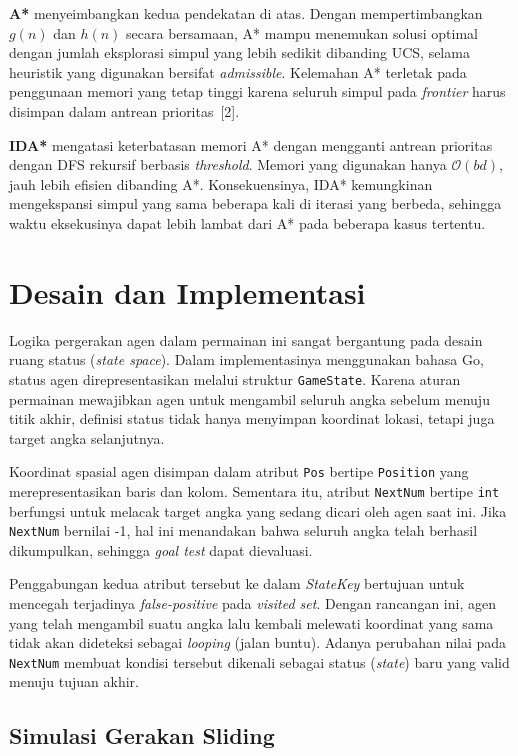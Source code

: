 \documentclass[12pt,a4paper]{article}
\begin{document}
\textbf{A*} menyeimbangkan kedua pendekatan di atas. Dengan mempertimbangkan $g(n)$
dan $h(n)$ secara bersamaan, A* mampu menemukan solusi optimal dengan jumlah
eksplorasi simpul yang lebih sedikit dibanding UCS, selama heuristik yang digunakan
bersifat \textit{admissible}. Kelemahan A* terletak pada penggunaan memori yang
tetap tinggi karena seluruh simpul pada \textit{frontier} harus disimpan dalam
antrean prioritas~[2].

\textbf{IDA*} mengatasi keterbatasan memori A* dengan mengganti antrean prioritas
dengan DFS rekursif berbasis \textit{threshold}. Memori yang digunakan hanya
$\mathcal{O}(bd)$, jauh lebih efisien dibanding A*. Konsekuensinya, IDA*
kemungkinan mengekspansi simpul yang sama beberapa kali di iterasi yang berbeda,
sehingga waktu eksekusinya dapat lebih lambat dari A* pada beberapa kasus tertentu.

\section{Desain dan Implementasi}

Logika pergerakan agen dalam permainan ini sangat bergantung pada desain ruang status (\textit{state space}). Dalam implementasinya menggunakan bahasa Go, status agen direpresentasikan melalui struktur \texttt{GameState}. Karena aturan permainan mewajibkan agen untuk mengambil seluruh angka sebelum menuju titik akhir, definisi status tidak hanya menyimpan koordinat lokasi, tetapi juga target angka selanjutnya.

Koordinat spasial agen disimpan dalam atribut \texttt{Pos} bertipe \texttt{Position} yang merepresentasikan baris dan kolom. Sementara itu, atribut \texttt{NextNum} bertipe \texttt{int} berfungsi untuk melacak target angka yang sedang dicari oleh agen saat ini. Jika \texttt{NextNum} bernilai -1, hal ini menandakan bahwa seluruh angka telah berhasil dikumpulkan, sehingga \textit{goal test} dapat dievaluasi.

Penggabungan kedua atribut tersebut ke dalam \textit{StateKey} bertujuan untuk mencegah terjadinya \textit{false-positive} pada \textit{visited set}. Dengan rancangan ini, agen yang telah mengambil suatu angka lalu kembali melewati koordinat yang sama tidak akan dideteksi sebagai \textit{looping} (jalan buntu). Adanya perubahan nilai pada \texttt{NextNum} membuat kondisi tersebut dikenali sebagai status (\textit{state}) baru yang valid menuju tujuan akhir.

\subsection{Simulasi Gerakan Sliding}
\end{document}
